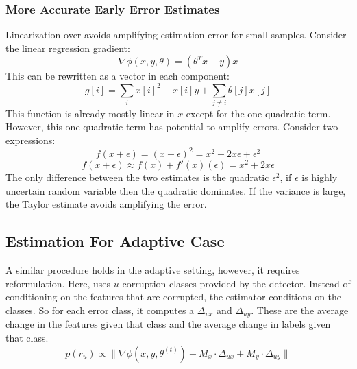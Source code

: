 \subsubsection{More Accurate Early Error Estimates}\label{acc}
Linearization over avoids amplifying estimation error for small samples.
Consider the linear regression gradient:
\[
\nabla\phi(x,y,\theta) = (\theta^Tx - y)x
\]
This can be rewritten as a vector in each component:
\[
g[i] = \sum_{i} x[i]^2-x[i]y + \sum_{j \ne i} \theta[j]x[j]
\]
This function is already mostly linear in $x$ except for the one quadratic term.
However, this one quadratic term has potential to amplify errors.
Consider two expressions:
\[
f(x+\epsilon) = (x+\epsilon)^2 = x^2 + 2x\epsilon + \epsilon^2
\]
\[
f(x+\epsilon) \approx f(x) + f'(x)(\epsilon) = x^2 + 2x\epsilon
\]
The only difference between the two estimates is the quadratic $\epsilon^2$, if $\epsilon$ is highly uncertain random variable then the quadratic dominates.
If the variance is large, the Taylor estimate avoids amplifying the error.


\iffalse
\subsection{Estimation For Adaptive Case}
A similar procedure holds in the adaptive setting, however, it requires reformulation.
Here, \sys uses $u$ corruption classes provided by the detector.
Instead of conditioning on the features that are corrupted, the estimator conditions on the classes.
So for each error class, it computes a $\Delta_{ux}$ and $\Delta_{uy}$.
These are the average change in the features given that class and the average change in labels given that class.
\[
p(r_u)\propto\|\nabla\phi(x,y,\theta^{(t)}) + M_x \cdot \Delta_{ux} +  M_y \cdot \Delta_{uy}\|
\] 

